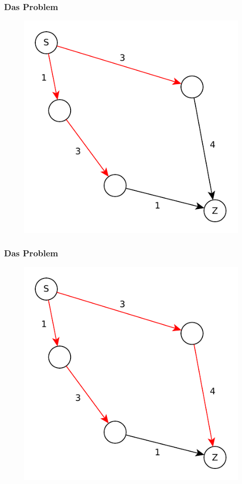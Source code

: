 \begin{frame}
\frametitle{Das Problem}
\begin{figure}
\includegraphics[scale=.8]{dijkstra_graphs/bfs_fail_3.pdf}
\end{figure}
\end{frame}

\begin{frame}
\frametitle{Das Problem}
\begin{figure}
\includegraphics[scale=.8]{dijkstra_graphs/bfs_fail_4.pdf}
\end{figure}
\end{frame}

